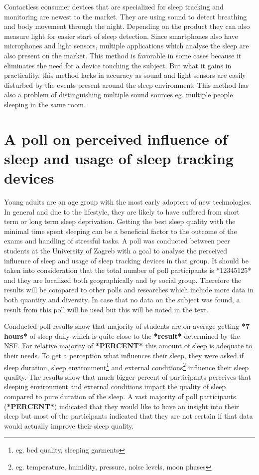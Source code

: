 Contactless consumer devices that are specialized for sleep tracking and monitoring are newest to the market. They are using sound to detect breathing and body movement through the night. Depending on the product they can also measure light for easier start of sleep detection. Since smartphones also have microphones and light sensors, multiple applications which analyse the sleep are also present on the market. This method is favorable in some cases because it eliminates the need for a device touching the subject. But what it gains in practicality, this method lacks in accuracy as sound and light sensors are easily disturbed by the events present around the sleep environment. This method has also a problem of distinguishing multiple sound sources eg. multiple people sleeping in the same room.


\section{A poll on perceived influence of sleep and usage of sleep tracking devices}

Young adults are an age group with the most early adopters of new technologies. In general and due to the lifestyle, they are likely to have suffered from short term or long term sleep deprivation. Getting the best sleep quality with the minimal time spent sleeping can be a beneficial factor to the outcome of the exams and handling of stressful tasks. A poll was conducted between peer students at the University of Zagreb with a goal to analyse the perceived influence of sleep and usage of sleep tracking devices in that group. It should be taken into consideration that the total number of poll participants is *12345125* and they are localized both geographically and by social group. Therefore the results will be compared to other polls and researches which include more data in both quantity and diversity. In case that no data on the subject was found, a result from this poll will be used but this will be noted in the text.

Conducted poll results show that majority of students are on average getting \textbf{*7 hours*} of sleep daily which is quite close to the \textbf{*result*} determined by the NSF\cite{NSF}. For relative majority of \textbf{*PERCENT*} this amount of sleep is adequate to their needs. To get a perception what influences their sleep, they were asked if sleep duration, sleep environment\footnote{eg. bed quality, sleeping garments} and external conditions\footnote{eg. temperature, humidity, pressure, noise levels, moon phases} influence their sleep quality. The results show that much bigger percent of participants perceives that sleeping environment and external conditions impact the quality of sleep compared to pure duration of the sleep. A vast majority of poll participants (\textbf{*PERCENT*}) indicated that they would like to have an insight into their sleep but most of the participants indicated that they are not certain if that data would actually improve their sleep quality. 

